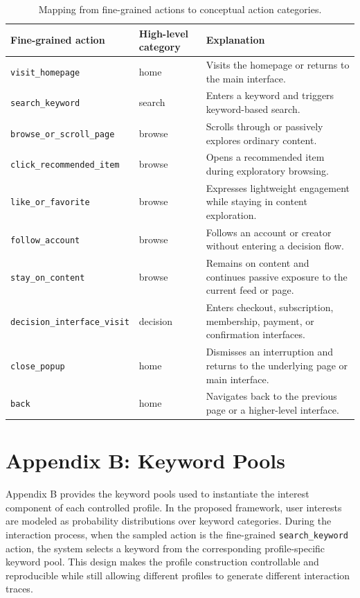\begin{table}[htbp]
    \centering
    \caption{Mapping from fine-grained actions to conceptual action categories.}
    \label{tab:action-mapping}
    \small
    \setlength{\tabcolsep}{4pt}
    \renewcommand{\arraystretch}{1.08}
    \begin{tabularx}{\textwidth}{@{}p{3.4cm}p{2.3cm}X@{}}
        \toprule
        \textbf{Fine-grained action} & \textbf{High-level category} & \textbf{Explanation} \\
        \midrule
        \texttt{visit\_homepage} & home & Visits the homepage or returns to the main interface. \\
        \texttt{search\_keyword} & search & Enters a keyword and triggers keyword-based search. \\
        \texttt{browse\_or\_scroll\_page} & browse & Scrolls through or passively explores ordinary content. \\
        \texttt{click\_recommended\_item} & browse & Opens a recommended item during exploratory browsing. \\
        \texttt{like\_or\_favorite} & browse & Expresses lightweight engagement while staying in content exploration. \\
        \texttt{follow\_account} & browse & Follows an account or creator without entering a decision flow. \\
        \texttt{stay\_on\_content} & browse & Remains on content and continues passive exposure to the current feed or page. \\
        \texttt{decision\_interface\_visit} & decision & Enters checkout, subscription, membership, payment, or confirmation interfaces. \\
        \texttt{close\_popup} & home & Dismisses an interruption and returns to the underlying page or main interface. \\
        \texttt{back} & home & Navigates back to the previous page or a higher-level interface. \\
        \bottomrule
    \end{tabularx}
\end{table}

\section{Appendix B: Keyword Pools}
\label{app:keyword-pools}

Appendix B provides the keyword pools used to instantiate the interest component of each controlled profile. In the proposed framework, user interests are modeled as probability distributions over keyword categories. During the interaction process, when the sampled action is the fine-grained \texttt{search\_keyword} action, the system selects a keyword from the corresponding profile-specific keyword pool. This design makes the profile construction controllable and reproducible while still allowing different profiles to generate different interaction traces.

